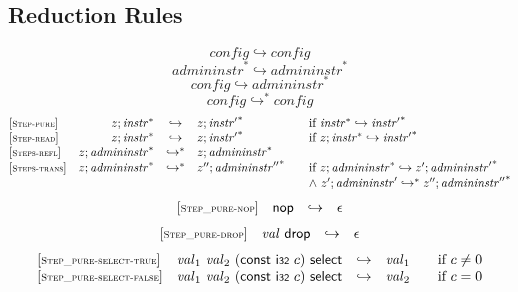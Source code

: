 \documentclass{article}
\begin{document}
\subsection{Reduction Rules}
$$
\boxed{{\mathit{config}} \hookrightarrow {\mathit{config}}}
$$
$$
\boxed{{{\mathit{admininstr}}^\ast} \hookrightarrow {{\mathit{admininstr}}^\ast}}
$$
$$
\boxed{{\mathit{config}} \hookrightarrow {{\mathit{admininstr}}^\ast}}
$$
$$
\boxed{{\mathit{config}} \hookrightarrow^\ast {\mathit{config}}}
$$
$$
\begin{array}{@{}l@{}rcl@{}l@{}}
{[\textsc{\scriptsize Step{-}pure}]} \quad & z ; {{\mathit{instr}}^\ast} &\hookrightarrow& z ; {{\mathit{instr}'}^\ast}
  &\qquad \mbox{if}~{{\mathit{instr}}^\ast} \hookrightarrow {{\mathit{instr}'}^\ast} \\
{[\textsc{\scriptsize Step{-}read}]} \quad & z ; {{\mathit{instr}}^\ast} &\hookrightarrow& z ; {{\mathit{instr}'}^\ast}
  &\qquad \mbox{if}~z ; {{\mathit{instr}}^\ast} \hookrightarrow {{\mathit{instr}'}^\ast} \\
{[\textsc{\scriptsize Steps{-}refl}]} \quad & z ; {{\mathit{admininstr}}^\ast} &\hookrightarrow^\ast& z ; {{\mathit{admininstr}}^\ast} \\
{[\textsc{\scriptsize Steps{-}trans}]} \quad & z ; {{\mathit{admininstr}}^\ast} &\hookrightarrow^\ast& {z''} ; {{\mathit{admininstr}''}^\ast}
  &\qquad \mbox{if}~z ; {{\mathit{admininstr}}^\ast} \hookrightarrow {z'} ; {{\mathit{admininstr}'}^\ast} \\
  &&&&\qquad {\land}~{z'} ; {\mathit{admininstr}'} \hookrightarrow^\ast {z''} ; {{\mathit{admininstr}''}^\ast} \\
\end{array}
$$
$$
\begin{array}{@{}l@{}rcl@{}l@{}}
{[\textsc{\scriptsize Step\_pure{-}nop}]} \quad & \mathsf{nop} &\hookrightarrow& \epsilon \\
\end{array}
$$
$$
\begin{array}{@{}l@{}rcl@{}l@{}}
{[\textsc{\scriptsize Step\_pure{-}drop}]} \quad & {\mathit{val}}~\mathsf{drop} &\hookrightarrow& \epsilon \\
\end{array}
$$
$$
\begin{array}{@{}l@{}rcl@{}l@{}}
{[\textsc{\scriptsize Step\_pure{-}select{-}true}]} \quad & {\mathit{val}}_1~{\mathit{val}}_2~(\mathsf{const}~\mathsf{i{\scriptstyle 32}}~c)~\mathsf{select} &\hookrightarrow& {\mathit{val}}_1
  &\qquad \mbox{if}~c \neq 0 \\
{[\textsc{\scriptsize Step\_pure{-}select{-}false}]} \quad & {\mathit{val}}_1~{\mathit{val}}_2~(\mathsf{const}~\mathsf{i{\scriptstyle 32}}~c)~\mathsf{select} &\hookrightarrow& {\mathit{val}}_2
  &\qquad \mbox{if}~c = 0 \\
\end{array}
$$
\end{document}
